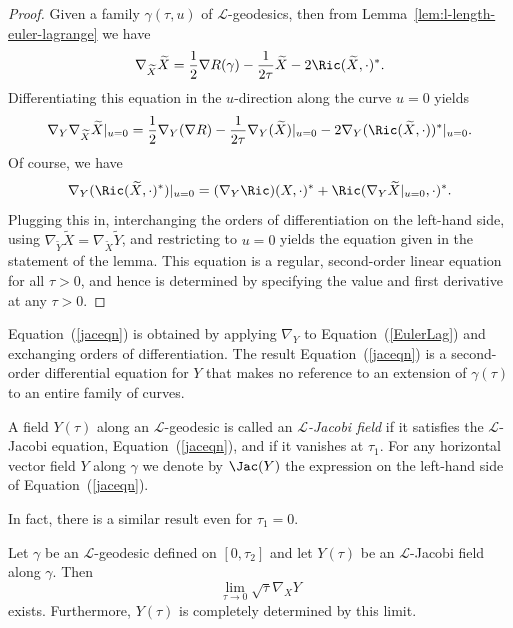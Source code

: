 \begin{proof}
\sketch
{}
Given a family $\gamma(\tau,u)$ of ${\mathcal L}$-geodesics, then
from Lemma~\ref{lem:l-length-euler-lagrange} we have
$$ \nabla_{\widetilde X}\widetilde X = \frac{1}{2}\nabla R(\gamma)
-\frac{1}{2\tau}\widetilde X - 2\Ric(\widetilde X,\cdot)^*.$$
Differentiating this equation in the $u$-direction along the curve
$u=0$ yields
$$\nabla_Y
\nabla_{\widetilde X}\widetilde X|_{u=0}=\frac{1}{2}\nabla_Y(\nabla
R)-\frac{1}{2\tau}\nabla_Y(\widetilde X)|_{u=0} -2\nabla_Y(\Ric(\widetilde X,\cdot))^*|_{u=0}.$$ Of course, we have
$$\nabla_Y(\Ric(\widetilde X,\cdot)^*)|_{u=0}=(\nabla_Y\Ric)(X,\cdot)^*
+\Ric(\nabla_Y\widetilde X|_{u=0},\cdot)^*.$$ Plugging this in,
interchanging the orders of differentiation on the left-hand side, using
$\nabla_{\widetilde Y}\widetilde X=\nabla_{\widetilde X}\widetilde Y$, and
restricting to $u=0$ yields the equation given in the statement of the lemma.
This equation is a regular, second-order linear equation  for all $\tau>0$, and
hence is determined by specifying the value and first derivative at any
$\tau>0$.
\end{proof}

Equation~(\ref{jaceqn}) is obtained by applying $\nabla_Y$ to
Equation~(\ref{EulerLag}) and exchanging orders of differentiation.
The result Equation~(\ref{jaceqn}) is a second-order differential
equation for $Y$ that makes no reference to an extension of
$\gamma(\tau)$ to an entire family of curves.



\begin{definition}\label{def:l-jacobi-field}
A field $Y(\tau)$ along an ${\mathcal L}$-geodesic is
called an {\em ${\mathcal L}$-Jacobi field} if it satisfies the ${\mathcal L}$-Jacobi
equation, Equation~(\ref{jaceqn}), and if it vanishes at $\tau_1$.
For any horizontal vector field $Y$ along $\gamma$ we denote by
$\Jac(Y)$ the expression on the left-hand
side of Equation~(\ref{jaceqn}).
\end{definition}

In fact, there is a similar result even for $\tau_1=0$.

\begin{lemma}\label{lem:l-jacobi-field-initial-limit}
Let $\gamma$ be an ${\mathcal L}$-geodesic defined on $[0,\tau_2]$
and let $Y(\tau)$ be an ${\mathcal L}$-Jacobi field along $\gamma$.
Then
$$\lim_{\tau\rightarrow 0}\sqrt{\tau}\nabla_XY$$
exists. Furthermore, $Y(\tau)$ is completely determined by this
limit.
\end{lemma}


